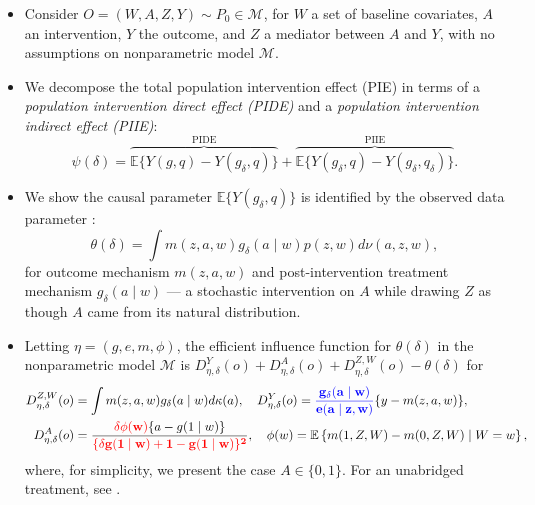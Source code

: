 \documentclass[landscape,a0paper,fontscale=0.285]{baposter} %
\begin{document}
\begin{poster}
{\begin{itemize}
\itemsep0.25pt
\item Consider $O = (W, A, Z, Y) \sim P_0 \in \mathcal{M}$, for $W$ a set of
  baseline covariates, $A$ an intervention, $Y$ the outcome, and $Z$ a mediator
  between $A$ and $Y$, with no assumptions on nonparametric model $\mathcal{M}$.
\item We decompose the total population intervention effect (PIE) in terms of a
  \textit{population intervention direct effect (PIDE)} and a \textit{population
  intervention indirect effect (PIIE)}:
  \begin{equation*}
    \psi(\delta) = \overbrace{\mathbb{E}\{Y(g, q) -
        Y(g_\delta, q)\}}^{\text{PIDE}} + \overbrace{\mathbb{E}\{Y(g_\delta, q)
        - Y(g_\delta, q_\delta)\}}^{\text{PIIE}}.
  \end{equation*}
\item We show the causal parameter $\mathbb{E}\{Y(g_\delta, q)\}$ is identified
  by the observed data parameter \cite{diaz2019causal}:
  \begin{equation*}
    \theta(\delta) = \int m(z, a, w)g_{\delta}(a\mid w)p(z,w) d\nu(a,z,w),
  \end{equation*}
  for outcome mechanism $m(z,a,w)$ and post-intervention treatment mechanism
  $g_{\delta}(a\mid w)$ --- a stochastic intervention on $A$ while drawing $Z$ as
  though $A$ came from its natural distribution.
\item Letting $\eta = (g, e, m, \phi)$, the efficient influence function for
  $\theta(\delta)$ in the nonparametric model $\mathcal{M}$ is
  $D^Y_{\eta, \delta}(o) + D^A_{\eta, \delta}(o) + D^{Z, W}_{\eta, \delta}(o) -
  \theta(\delta)$ for
  \vspace{-0.5em}
  \begin{align*}
    D^{Z, W}_{\eta, \delta}(o) &= \int m(z, a, w) g_{\delta}(a \mid w)
      d\kappa(a),
    \quad
    D^Y_{\eta, \delta}(o) = \mathbf{\textcolor{blue}{\frac{g_{\delta}(a \mid w)}
      {e(a \mid z, w)}}} \{y - m(z,a,w) \},\\
    D^A_{\eta,\delta}(o) &= \frac{\mathbf{\textcolor{red}{\delta\phi(w)}}\{a -
      g(1 \mid w)\}}{\mathbf{\textcolor{red}{\{\delta g(1 \mid w) + 1 -
      g(1 \mid w)\}^2}}},
    \quad
    \phi(w) = \mathbb{E}\left\{m(1, Z, W) - m(0, Z, W) \mid W = w \right\},
  \end{align*}
  where, for simplicity, we present the case $A \in \{0, 1\}$. For an unabridged
  treatment, see \cite{diaz2019causal}.
\end{itemize}
\vspace{0.5cm} %
}

\end{poster}
\end{document}
